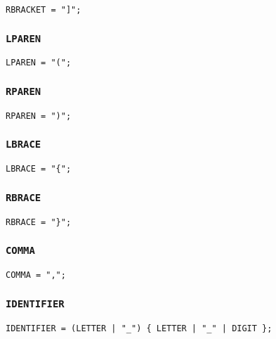 \documentclass[12pt, a4paper]{article}
\begin{document}
\begin{verbatim}
RBRACKET = "]";
\end{verbatim}

\subsubsection{\texttt{LPAREN}}

\begin{verbatim}
LPAREN = "(";
\end{verbatim}

\subsubsection{\texttt{RPAREN}}

\begin{verbatim}
RPAREN = ")";
\end{verbatim}

\subsubsection{\texttt{LBRACE}}

\begin{verbatim}
LBRACE = "{";
\end{verbatim}

\subsubsection{\texttt{RBRACE}}

\begin{verbatim}
RBRACE = "}";
\end{verbatim}

\subsubsection{\texttt{COMMA}}

\begin{verbatim}
COMMA = ",";
\end{verbatim}

\subsubsection{\texttt{IDENTIFIER}}

\begin{verbatim}
IDENTIFIER = (LETTER | "_") { LETTER | "_" | DIGIT };
\end{verbatim}
\end{document}
